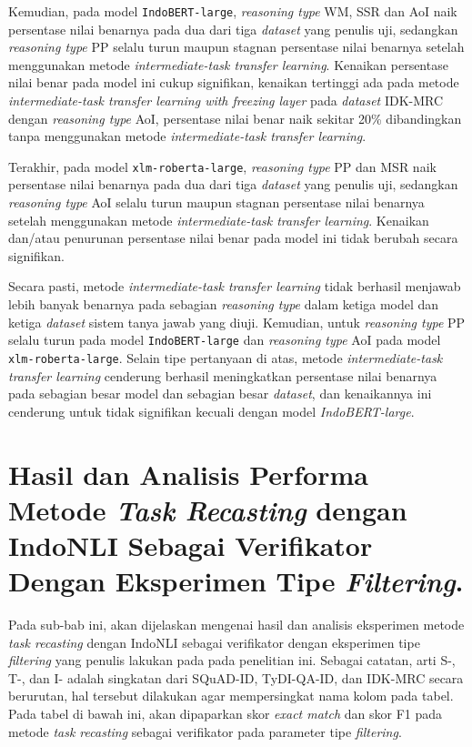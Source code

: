 Kemudian, pada model \texttt{IndoBERT-large}, \emph{reasoning type} WM, SSR dan AoI naik persentase nilai benarnya pada dua dari tiga \emph{dataset} yang penulis uji, sedangkan \emph{reasoning type} PP selalu turun maupun stagnan persentase nilai benarnya setelah menggunakan metode \emph{intermediate-task transfer learning}. Kenaikan persentase nilai benar pada model ini cukup signifikan, kenaikan tertinggi ada pada metode \emph{intermediate-task transfer learning with freezing layer} pada \emph{dataset} IDK-MRC dengan \emph{reasoning type} AoI, persentase nilai benar naik sekitar 20\% dibandingkan tanpa menggunakan metode \emph{intermediate-task transfer learning}.

Terakhir, pada model \texttt{xlm-roberta-large}, \emph{reasoning type} PP dan MSR naik persentase nilai benarnya pada dua dari tiga \emph{dataset} yang penulis uji, sedangkan \emph{reasoning type} AoI selalu turun maupun stagnan persentase nilai benarnya setelah menggunakan metode \emph{intermediate-task transfer learning}. Kenaikan dan/atau penurunan persentase nilai benar pada model ini tidak berubah secara signifikan.

Secara pasti, metode \emph{intermediate-task transfer learning} tidak berhasil menjawab lebih banyak benarnya pada sebagian \emph{reasoning type} dalam ketiga model dan ketiga \emph{dataset} sistem tanya jawab yang diuji. Kemudian, untuk \emph{reasoning type} PP selalu turun pada model \texttt{IndoBERT-large} dan \emph{reasoning type} AoI pada model \texttt{xlm-roberta-large}. Selain tipe pertanyaan di atas, metode \emph{intermediate-task transfer learning} cenderung berhasil meningkatkan persentase nilai benarnya pada sebagian besar model dan sebagian besar \emph{dataset}, dan kenaikannya ini cenderung untuk tidak signifikan kecuali dengan model \emph{IndoBERT-large}. 

\section{Hasil dan Analisis Performa Metode \emph{Task Recasting} dengan IndoNLI Sebagai Verifikator Dengan Eksperimen Tipe \emph{Filtering}.}
\label{5.3}
Pada sub-bab ini, akan dijelaskan mengenai hasil dan analisis eksperimen metode \emph{task recasting} dengan IndoNLI sebagai verifikator dengan eksperimen tipe \emph{filtering} yang penulis lakukan pada pada penelitian ini. Sebagai catatan, arti S-, T-, dan I- adalah singkatan dari SQuAD-ID, TyDI-QA-ID, dan IDK-MRC secara berurutan, hal tersebut dilakukan agar mempersingkat nama kolom pada tabel. Pada tabel di bawah ini, akan dipaparkan skor \emph{exact match} dan skor F1 pada metode \emph{task recasting} sebagai verifikator pada parameter tipe \emph{filtering}.

